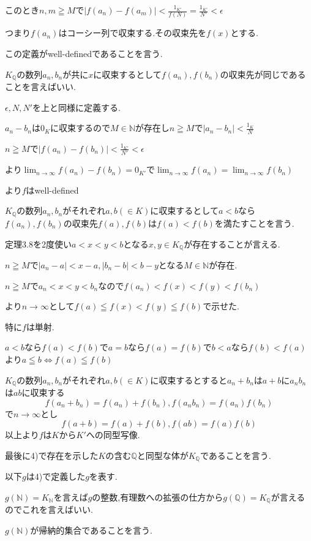\documentclass{jsarticle}
\begin{document}
このとき$n,m\geqq M$で$|f(a_n)-f(a_m)|<\frac{1_{K'}}{f(N)}=\frac{1_{K'}}{N'}<\epsilon$

つまり$f(a_n)$はコーシー列で収束する.その収束先を$f(x)$とする.

この定義がwell-definedであることを言う.

$K_{\mathbb{Q}}$の数列$a_n,b_n$が共に$x$に収束するとして$f(a_n),f(b_n)$の収束先が同じであることを言えばいい.

$\epsilon ,N,N'$を上と同様に定義する.

$a_n-b_n$は$0_{K}$に収束するので$M\in\mathbb{N}$が存在し$n\geqq M$で$|a_n-b_n|<\frac{1_K}{N}$

$n\geqq M$で$|f(a_n)-f(b_n)|<\frac{1_{K'}}{N'}<\epsilon$

より$\displaystyle \lim_{n\to\infty}f(a_n)-f(b_n)=0_{K'}$で$\displaystyle \lim_{n\to\infty}f(a_n)=\displaystyle \lim_{n\to\infty}f(b_n)$

より$f$はwell-defined

$K_{\mathbb{Q}}$の数列$a_n,b_n$がそれぞれ$a,b(\in K)$に収束するとして$a<b$なら$f(a_n),f(b_n)$の収束先$f(a),f(b)$は$f(a)<f(b)$を満たすことを言う.

定理3.8を2度使い$a<x<y<b$となる$x,y\in K_{\mathbb{Q}}$が存在することが言える.

$n\geqq M$で$|a_n-a|<x-a,|b_n-b|<b-y$となる$M\in\mathbb{N}$が存在.

$n\geqq M$で$a_n<x<y<b_n$なので$f(a_n)<f(x)<f(y)<f(b_n)$

より$n\to\infty$として$f(a)\leqq f(x)<f(y) \leqq f(b)$で示せた.

特に$f$は単射.

$a<b$なら$f(a)<f(b)$で$a=b$なら$f(a)=f(b)$で$b<a$なら$f(b)<f(a)$より$a\leqq b\Leftrightarrow f(a)\leqq f(b)$

$K_{\mathbb{Q}}$の数列$a_n,b_n$がそれぞれ$a,b(\in K)$に収束するとすると$a_n+b_n$は$a+b$に$a_nb_n$は$ab$に収束する
\[f(a_n+b_n)=f(a_n)+f(b_n),f(a_nb_n)=f(a_n)f(b_n)\]
で$n\to\infty$とし
\[f(a+b)=f(a)+f(b),f(ab)=f(a)f(b)\]
以上より$f$は$K$から$K'$への同型写像.

最後に4)で存在を示した$K$の含む$\mathbb{Q}$と同型な体が$K_{\mathbb{Q}}$であることを言う.

以下$g$は4)で定義した$g$を表す.

$g(\mathbb{N}) = K_{\mathbb{N}}$を言えば$g$の整数,有理数への拡張の仕方から$g(\mathbb{Q}) = K_{\mathbb{Q}}$が言えるのでこれを言えばいい.

$g(\mathbb{N})$が帰納的集合であることを言う.
\end{document}
